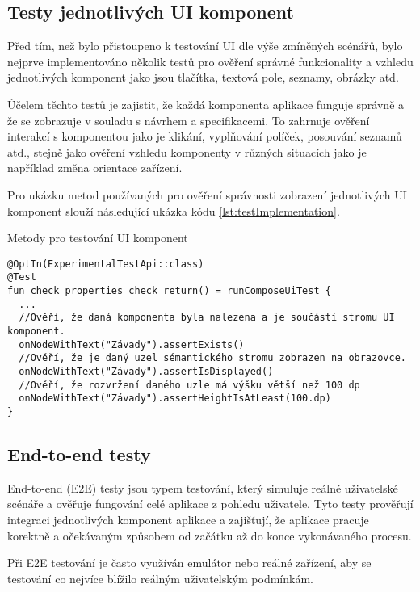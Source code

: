 \subsection{Testy jednotlivých UI komponent}
Před tím, než bylo přistoupeno k testování UI dle výše zmíněných scénářů, bylo nejprve implementováno několik testů pro ověření správné 
funkcionality a vzhledu jednotlivých komponent jako jsou tlačítka, textová pole, seznamy, obrázky atd.

Účelem těchto testů je zajistit, že každá komponenta aplikace funguje správně a že se zobrazuje v souladu s návrhem a specifikacemi. 
To zahrnuje ověření interakcí s komponentou jako je klikání, vyplňování políček, posouvání seznamů atd., stejně jako ověření vzhledu komponenty v 
různých situacích jako je například změna orientace zařízení.

\bigskip

Pro ukázku metod používaných pro ověření správnosti zobrazení jednotlivých UI komponent slouží následující ukázka kódu \ref{lst:testImplementation}.

\begin{listing}[H]
  \caption{Metody pro testování UI komponent}\label{lst:testImplementation}
  \begin{verbatim}
@OptIn(ExperimentalTestApi::class)
@Test
fun check_properties_check_return() = runComposeUiTest {
  ...
  //Ověří, že daná komponenta byla nalezena a je součástí stromu UI komponent.
  onNodeWithText("Závady").assertExists()
  //Ověří, že je daný uzel sémantického stromu zobrazen na obrazovce.
  onNodeWithText("Závady").assertIsDisplayed()
  //Ověří, že rozvržení daného uzle má výšku větší než 100 dp
  onNodeWithText("Závady").assertHeightIsAtLeast(100.dp)
}
\end{verbatim}
\end{listing}

\subsection{End-to-end testy}
End-to-end (E2E) testy jsou typem testování, který simuluje reálné uživatelské scénáře a ověřuje fungování celé aplikace z pohledu uživatele.
Tyto testy prověřují integraci jednotlivých komponent aplikace a zajišťují, že aplikace pracuje korektně a očekávaným způsobem od začátku až 
do konce vykonávaného procesu.

Při E2E testování je často využíván emulátor nebo reálné zařízení, aby se testování co nejvíce blížilo reálným uživatelským podmínkám. 


